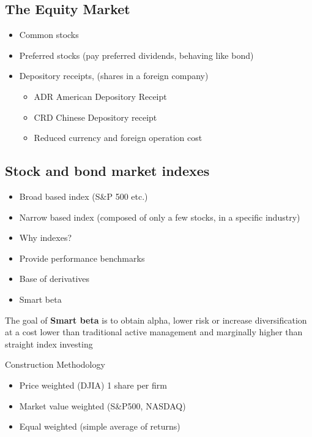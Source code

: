 \documentclass[
]{book}
\providecommand{\tightlist}{%
  \setlength{\itemsep}{0pt}\setlength{\parskip}{0pt}}
\begin{document}
\subsection{The Equity Market}\label{the-equity-market}

\begin{itemize}
\tightlist
\item
  Common stocks
\item
  Preferred stocks (pay preferred dividends, behaving like bond)
\item
  Depository receipts, (shares in a foreign company)

  \begin{itemize}
  \tightlist
  \item
    ADR American Depository Receipt
  \item
    CRD Chinese Depository receipt
  \item
    Reduced currency and foreign operation cost
  \end{itemize}
\end{itemize}

\subsection{Stock and bond market indexes}\label{stock-and-bond-market-indexes}

\begin{itemize}
\tightlist
\item
  Broad based index (S\&P 500 etc.)
\item
  Narrow based index (composed of only a few stocks, in a specific industry)
\item
  Why indexes?
\item
  Provide performance benchmarks
\item
  Base of derivatives
\item
  Smart beta
\end{itemize}

The goal of \textbf{Smart beta} is to obtain alpha, lower risk or increase diversification at a cost lower than traditional active management and marginally higher than straight index investing

Construction Methodology

\begin{itemize}
\tightlist
\item
  Price weighted (DJIA) 1 share per firm
\item
  Market value weighted (S\&P500, NASDAQ)
\item
  Equal weighted (simple average of returns)
\end{itemize}
\end{document}
